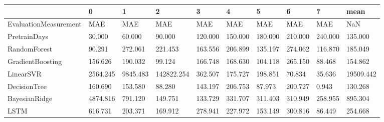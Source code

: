 \begin{tabular}{llllllllll}
\toprule
{} &        0 &        1 &          2 &       3 &       4 &       5 &       6 &       7 &      mean \\
\midrule
EvaluationMeasurement &      MAE &      MAE &        MAE &     MAE &     MAE &     MAE &     MAE &     MAE &       NaN \\
PretrainDays          &   30.000 &   60.000 &     90.000 & 120.000 & 150.000 & 180.000 & 210.000 & 240.000 &   135.000 \\
RandomForest          &   90.291 &  272.061 &    221.453 & 163.556 & 206.899 & 135.197 & 274.062 & 116.870 &   185.049 \\
GradientBoosting      &  156.626 &  190.032 &     99.124 & 166.748 & 168.630 & 104.118 & 265.150 &  88.468 &   154.862 \\
LinearSVR             & 2564.245 & 9845.483 & 142822.254 & 362.507 & 175.727 & 198.851 &  70.834 &  35.636 & 19509.442 \\
DecisionTree          &  160.690 &  153.580 &     88.280 & 143.197 & 206.753 &  87.973 & 200.727 &   0.943 &   130.268 \\
BayesianRidge         & 4874.816 &  791.120 &    149.751 & 133.729 & 331.707 & 311.403 & 310.949 & 258.955 &   895.304 \\
LSTM                  &  616.731 &  203.371 &    169.912 & 278.941 & 227.972 & 153.149 & 300.816 &  86.449 &   254.668 \\
\bottomrule
\end{tabular}
